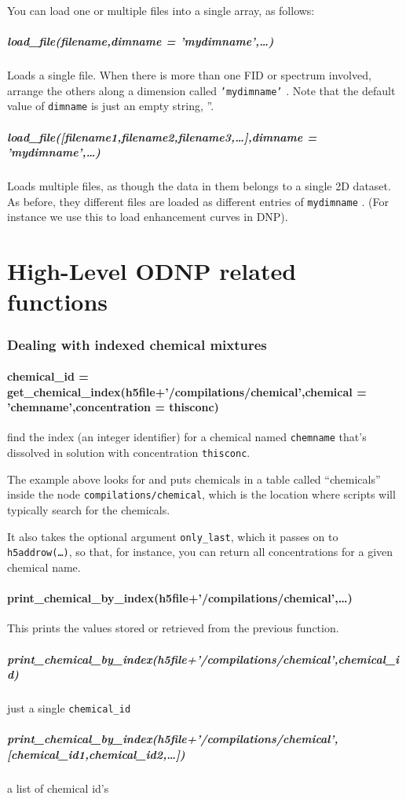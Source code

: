 You can load one or multiple files into a single array, as follows:

\subparagraph{load\_file(filename,dimname = 'mydimname',\ldots)}
Loads a single file.
When there is more than one FID or spectrum involved,
        arrange the others along a dimension called \texttt{'mydimname'} .
Note that the default value of \texttt{dimname} is just an empty string, ''.

\subparagraph{load\_file([filename1,filename2,filename3,\ldots],dimname = 'mydimname',\ldots)}
Loads multiple files,
    as though the data in them belongs to a single 2D dataset.
As before, they different files are loaded as different entries of \texttt{mydimname} .
(For instance we use this to load enhancement curves in DNP).

\section{High-Level ODNP related functions}
\subsubsection{Dealing with indexed chemical mixtures}
\paragraph{chemical\_id = get\_chemical\_index(h5file+'/compilations/chemical',chemical = 'chemname',concentration = thisconc)}
find the index (an integer identifier) for a chemical named \texttt{chemname} that's dissolved in solution with concentration \texttt{thisconc}.

The example above looks for and puts chemicals in a table called ``chemicals'' inside the node \texttt{compilations/chemical}, which is the location where scripts will typically search for the chemicals.

It also takes the optional argument \texttt{only\_last}, which it passes on to \texttt{h5addrow(\ldots)},
    so that, for instance, you can return all concentrations for a given chemical name.
\paragraph{print\_chemical\_by\_index(h5file+'/compilations/chemical',\ldots)}
This prints the values stored or retrieved from the previous function.
\subparagraph{print\_chemical\_by\_index(h5file+'/compilations/chemical',chemical\_id)}
just a single \texttt{chemical\_id} 
\subparagraph{print\_chemical\_by\_index(h5file+'/compilations/chemical',[chemical\_id1,chemical\_id2,\ldots])}
a list of chemical id's

